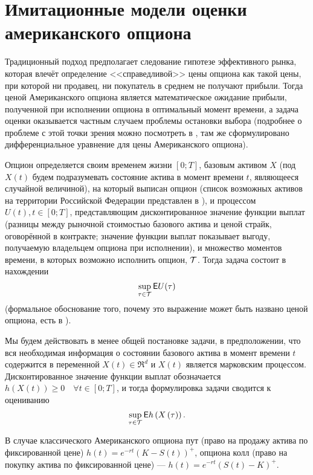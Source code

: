 \chapter{Имитационные модели оценки американского опциона}

Традиционный подход предполагает следование гипотезе эффективного рынка, которая влечёт определение <<справедливой>> цены опциона как такой цены, при которой ни продавец, ни покупатель в среднем не получают прибыли. Тогда ценой Американского опциона является математическое ожидание прибыли, полученной при исполнении опциона в оптимальный момент времени, а задача оценки оказывается частным случаем проблемы остановки выбора (подробнее о проблеме с этой точки зрения можно посмотреть в \cite{Peskir2006}, там же сформулировано дифференциальное уравнение для цены Американского опциона).

Опцион определяется своим временем жизни $[0;T]$, базовым активом $X$ (под $X(t)$ будем подразумевать состояние актива в момент времени $t$, являющееся случайной величиной), на который выписан опцион (список возможных активов на территории Российской Федерации представлен в \cite{fsfr}), и процессом $U(t), t\in [0;T]$, представляющим дисконтированное значение функции выплат (разницы между рыночной стоимостью базового актива и ценой страйк, оговорённой в контракте; значение функции выплат показывает выгоду, получаемую владельцем опциона при исполнении), и множество моментов времени, в которых возможно исполнить опцион, $\mathcal{T}$. Тогда задача состоит в нахождении 
\begin{equation}\label{eq:supremum_of_expectation}\sup_{\tau\in\mathcal{T}} \mathsf{E} U(\tau)\end{equation}
(формальное обоснование того, почему это выражение может быть названо ценой опциона, есть в \cite{Duffie2001}).

Мы будем действовать в менее общей постановке задачи, в предположении, что вся необходимая информация о состоянии базового актива в момент времени $t$ содержится в переменной $X(t)\in \mathfrak{R}^d$ и $X(t)$ является марковским процессом. Дисконтированное значение функции выплат обозначается $h\left(X\left(t\right)\right) \geq 0 \quad\forall t\in \left[0;T\right]$, и тогда формулировка задачи сводится к оцениванию $$\sup_{\tau\in\mathcal{T}}\mathsf{E} h\left(X\left(\tau\right)\right).$$

В случае классического Американского опциона пут (право на продажу актива по фиксированной цене) $h(t) = e^{-rt}\left(K-S\left(t\right)\right)^+$, опциона колл (право на покупку актива по фиксированной цене) --- $h(t) = e^{-rt}\left(S\left(t\right) - K\right)^+$.

